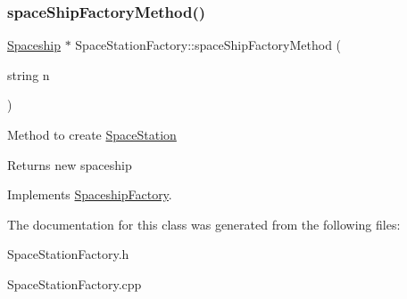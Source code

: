 \subsubsection{\texorpdfstring{space\+Ship\+Factory\+Method()}{spaceShipFactoryMethod()}}
{\footnotesize\ttfamily \hyperlink{classSpaceship}{Spaceship} $\ast$ Space\+Station\+Factory\+::space\+Ship\+Factory\+Method (\begin{DoxyParamCaption}\item[{string}]{n }\end{DoxyParamCaption})\hspace{0.3cm}{\ttfamily [virtual]}}

Method to create \hyperlink{classSpaceStation}{Space\+Station} \begin{DoxyReturn}{Returns}
new spaceship 
\end{DoxyReturn}


Implements \hyperlink{classSpaceshipFactory_a70b50dd616cb16f50088eff9ca07cda9}{Spaceship\+Factory}.



The documentation for this class was generated from the following files\+:\begin{DoxyCompactItemize}
\item 
Space\+Station\+Factory.\+h\item 
Space\+Station\+Factory.\+cpp\end{DoxyCompactItemize}

